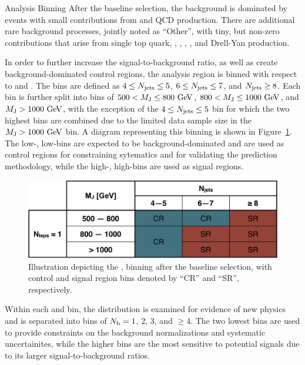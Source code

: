 \begin{section}{Analysis Binning}
After the baseline selection, the background is dominated by \ttbar events with small contributions from \Wjets and QCD production.
There are additional rare background processes, jointly noted as ``Other'', with tiny, but non-zero contributions that arise from single top quark, \ttW, \ttZ, \ttH, \tttt, and Drell-Yan production.

In order to further increase the signal-to-background ratio, as well as create background-dominated control regions, the analysis region is binned with respect to \Njets and \MJ. 
The \Njets bins are defined as $4 \leq N_{\mathrm{jets}} \leq 5$, $6 \leq N_{\mathrm{jets}} \leq 7$, and $N_{\mathrm{jets}} \geq 8$.
Each \Njets bin is further split into bins of $500 < M_{\mathrm{J}} \leq 800~\mathrm{Ge\kern -0.1em V}$, $800 < M_{\mathrm{J}} \leq 1000~\mathrm{Ge\kern -0.1em V}$, and $M_{\mathrm{J}} > 1000~\mathrm{Ge\kern -0.1em V}$, with the exception of the $4 \leq N_{\mathrm{jets}} \leq 5$ bin for which the two highest \MJ bins are combined due to the limited data sample size in the $M_{\mathrm{J}} > 1000~\mathrm{Ge\kern -0.1em V}$ bin.
A diagram representing this binning is shown in Figure~\ref{fig:analysis_regions}.
The low-\Njets, low-\MJ bins are expected to be background-dominated and are used as control regions for constraining sytematics and for validating the prediction methodology, while the high-\Njets, high-\MJ bins are used as signal regions.

\begin{figure}[tbp!]
\centering
\includegraphics[angle=0,width=0.80\columnwidth]{fig/binning_nlep1.pdf}
\caption{Illustration depicting the \Njets, \MJ binning after the baseline selection, with control and signal region bins denoted by ``CR'' and ``SR'', respectively.}
\label{fig:analysis_regions} 
\end{figure}

Within each \Njets and \MJ bin, the \Nb distribution is examined for evidence of new physics and is separated into bins of $N_{\mathrm{b}} = 1$, 2, 3, and $\geq 4$.
The two lowest \Nb bins are used to provide constraints on the background normalizations and systematic uncertainites, while the higher \Nb bins are the most sensitive to potential signals due to its larger signal-to-background ratios.


\end{section}
